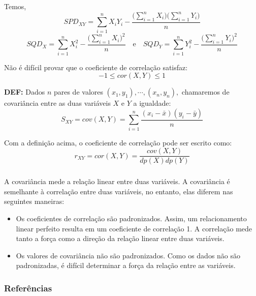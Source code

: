 \documentclass[14pt,aspectratio=1610]{beamer}
\begin{document}
\begin{frame}{}
\frametitle{}
\begin{block}{}
\justifying
Temos,
$$SPD_{XY}=\sum_{i=1}^{n}X_{i}Y_{i}-\dfrac{\Big({\displaystyle\sum_{i=1}^{n}X_{i}}\Big)\Big({\displaystyle\sum_{i=1}^{n}Y_{i}\Big)}}{n}$$
\pause
$$SQD_{X}=\displaystyle{\sum_{i=1}^{n}X_{i}^{2}}-\dfrac{\Big(\displaystyle{\sum_{i=1}^{n}X_{i}}\Big)^{2}}{n}\quad \textrm{e}\quad SQD_{Y}=\displaystyle{\sum_{i=1}^{n}Y_{i}^{2}}-\dfrac{\Big(\displaystyle{\sum_{i=1}^{n}Y_{i}}\Big)^{2}}{n}$$
\end{block}
\pause
\vspace{-0.06cm}
\begin{block}{}
\justifying
Não é difícil provar que o coeficiente de correlação satisfaz:
$$-1\leq cor(X,Y)\leq 1$$
\end{block}
\end{frame}

\begin{frame}{}
    \begin{block}{}
\justifying
{\bf DEF:} Dados $n$ pares de valores $(x_{1}, y_{1}), \cdots, (x_{n}, y_{n}),$ chamaremos de covariância entre as duas variáveis $X$ e $Y$ a igualdade:
$$S_{XY}=cov(X,Y)={\displaystyle \sum_{i=1}^{n}\dfrac{(x_{i}-\bar{x})(y_{i}-\bar{y})}{n}}$$
\end{block}
\pause
\begin{block}{}
\justifying
Com a definição acima, o coeficiente de correlação pode ser escrito como:
$$r_{XY}=cor(X,Y)=\dfrac{cov(X,Y)}{dp(X)dp(Y)}$$
\end{block}
\end{frame}

\begin{frame}{}
\frametitle{}
\begin{block}{}
\justifying
A covariância mede a relação linear entre duas variáveis. A covariância é semelhante à correlação entre duas variáveis, no entanto, elas diferem nas seguintes maneiras:
\end{block}
\pause
\begin{block}{}
\justifying
\begin{itemize}
\item Os coeficientes de correlação são padronizados. Assim, um relacionamento linear perfeito resulta em um coeficiente de correlação 1. A correlação mede tanto a força como a direção da relação linear entre duas variáveis.
\end{itemize}
\end{block}
\pause
\begin{block}{}
\justifying
\begin{itemize}
\item Os valores de covariância não são padronizados. Como os dados não são padronizadas, é difícil determinar a força da relação entre as variáveis.
\end{itemize}
\nocite{roteiro}
\end{block}
\end{frame}

\begin{frame}%
\frametitle{\bf Referências}
%
\printbibliography
\end{frame}
\end{document}
